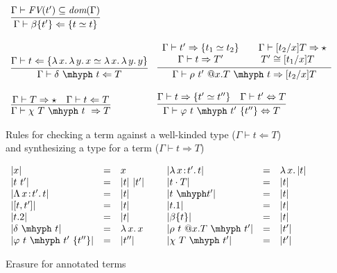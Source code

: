\documentclass{article}
\newcommand{\abs}[4]{{#1}\, #2\! : \! #3.\, #4}
\newcommand{\absu}[3]{{#1}\, #2.\, #3}
\newcommand{\tpcheck}[0]{\Leftarrow}
\newcommand{\tpsynth}[0]{\Rightarrow}
\begin{document}
\begin{figure}
\[\begin{array}{ll}
    \infer{\Gamma\vdash \beta\{t'\} \tpcheck \{ t \simeq t \}}{\Gamma\vdash \textit{FV}(t')\subseteq \textit{dom}(\Gamma)}  \\ \\    
    \infer{\Gamma\vdash \delta\ \mhyph\ t \tpcheck T}{\Gamma\vdash t\tpcheck \{ \absu{\lambda}{x}{\absu{\lambda}{y}{x}} \simeq \absu{\lambda}{x}{\absu{\lambda}{y}{y}}\}}  &
    \infer{\Gamma \vdash \rho\ t'\ @x.T\ \mhyph\ t \tpsynth [t_2/x]T}
          {
          \begin{array}{cc}
            \Gamma \vdash t' \tpsynth \{t_1 \simeq t_2\}
            & \quad \Gamma \vdash [t_2/x]T \tpsynth \star
            \\ \Gamma \vdash t \tpsynth T'
            & T' \cong [t_1/x]T
          \end{array}
          } \\ \\
    \infer{\Gamma \vdash \chi\ T\ \mhyph\ t\ \tpsynth T}
          {\Gamma \vdash T \tpsynth \star & \Gamma \vdash t \tpcheck T} &
    \infer{\Gamma\vdash \varphi\ t\ \mhyph\ t'\ \{t''\} \Leftrightarrow T}
          {\Gamma\vdash t\tpsynth \{t'\simeq t''\} & \Gamma\vdash t' \Leftrightarrow T}
  \end{array}
  \]
\caption{Rules for checking a term against a well-kinded type ($\Gamma \vdash t \tpcheck T$)
           and synthesizing a type for a term ($\Gamma \vdash t \tpsynth T$)}
\label{fig:tp}
\end{figure}


\begin{figure}
  \[
  \begin{array}{lllllll}
    |x| & = & x &\ &
    |\abs{\lambda}{x}{t'}{t}| & = & \absu{\lambda}{x}{|t|} \\
    |t\ t'| & = & |t|\ |t'| &\ &
    |t\cdot T| & = & |t| \\
    |\abs{\Lambda}{x}{t'}{t}| & = & |t| &\ &
    |t\ \mhyph t'| & = & |t| \\
    |[t , t']| & = & |t| &\ &
    |t.1| & = & |t| \\
    |t.2| & = & |t| &\ &
    |\beta\{t\}| & = & |t|\\
    |\delta\ \mhyph\ t| & = & \absu{\lambda}{x}{x}&\ &
    |\rho\ t\ @x.T\ \mhyph\ t'| & = & |t'| \\
    |\varphi\ t\ \mhyph\ t'\ \{t''\}| & = & |t''| &\ &
    |\chi\ T\ \mhyph\ t'| & = & |t'|
  \end{array}
  \]
  \caption{Erasure for annotated terms}
  \label{fig:eraser}
\end{figure}  
\end{document}

